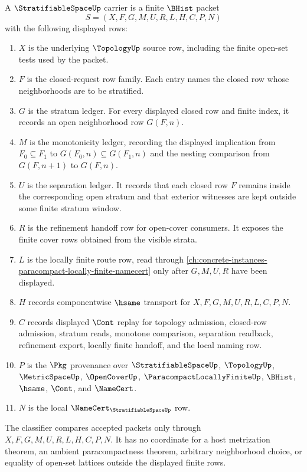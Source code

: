\begin{definition}
\label{def:stratifiable-space-carrier}
A $\StratifiableSpaceUp$ carrier is a finite $\BHist$ packet
$$
S=(X,F,G,M,U,R,L,H,C,P,N)
$$
with the following displayed rows:
\begin{enumerate}
\item $X$ is the underlying $\TopologyUp$ source row, including the finite open-set tests used by the packet.
\item $F$ is the closed-request row family. Each entry names the closed row whose neighborhoods are to be stratified.
\item $G$ is the stratum ledger. For every displayed closed row and finite index, it records an open neighborhood row $G(F,n)$.
\item $M$ is the monotonicity ledger, recording the displayed implication from $F_0 \subseteq F_1$ to $G(F_0,n) \subseteq G(F_1,n)$ and the nesting comparison from $G(F,n+1)$ to $G(F,n)$.
\item $U$ is the separation ledger. It records that each closed row $F$ remains inside the corresponding open stratum and that exterior witnesses are kept outside some finite stratum window.
\item $R$ is the refinement handoff row for open-cover consumers. It exposes the finite cover rows obtained from the visible strata.
\item $L$ is the locally finite route row, read through \autoref{ch:concrete-instances-paracompact-locally-finite-namecert} only after $G,M,U,R$ have been displayed.
\item $H$ records componentwise $\hsame$ transport for $X,F,G,M,U,R,L,C,P,N$.
\item $C$ records displayed $\Cont$ replay for topology admission, closed-row admission, stratum reads, monotone comparison, separation readback, refinement export, locally finite handoff, and the local naming row.
\item $P$ is the $\Pkg$ provenance over $\StratifiableSpaceUp$, $\TopologyUp$, $\MetricSpaceUp$, $\OpenCoverUp$, $\ParacompactLocallyFiniteUp$, $\BHist$, $\hsame$, $\Cont$, and $\NameCert$.
\item $N$ is the local $\NameCert_{\StratifiableSpaceUp}$ row.
\end{enumerate}
The classifier compares accepted packets only through $X,F,G,M,U,R,L,H,C,P,N$. It has no coordinate for a host metrization theorem, an ambient paracompactness theorem, arbitrary neighborhood choice, or equality of open-set lattices outside the displayed finite rows.
\end{definition}

